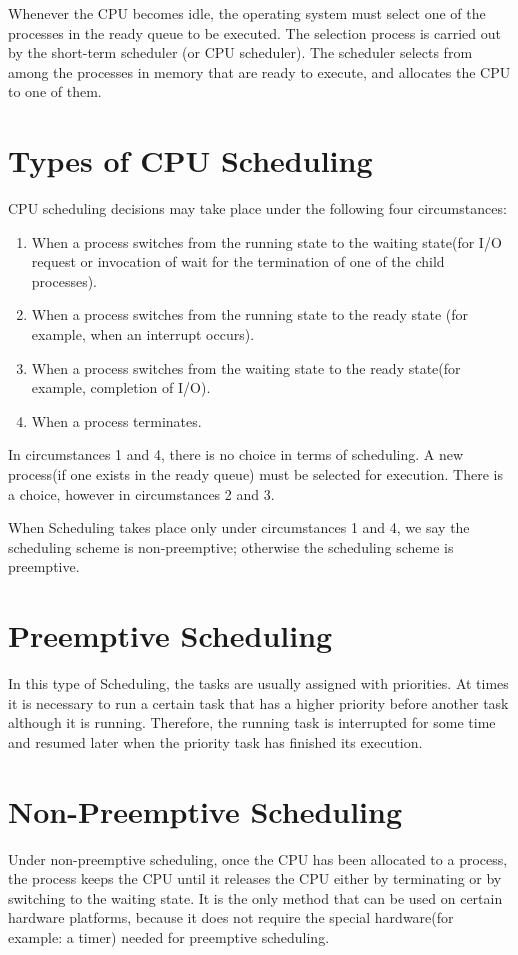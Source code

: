 \documentclass[11pt,a4paper]{report}
\begin{document}
Whenever the CPU becomes idle, the operating system must select one of the processes in the ready queue to be executed. The selection process is carried out by the short-term scheduler (or CPU scheduler). The scheduler selects from among the processes in memory that are ready to execute, and allocates the CPU to one of them.

\section{Types of CPU Scheduling}

CPU scheduling decisions may take place under the following four circumstances:

\begin{enumerate}
	\item When a process switches from the running state to the waiting state(for I/O request or invocation of wait for the termination of one of the child processes).
    \item When a process switches from the running state to the ready state (for example, when an interrupt occurs).
    \item When a process switches from the waiting state to the ready state(for example, completion of I/O).
    \item When a process terminates.
\end{enumerate}
    

In circumstances 1 and 4, there is no choice in terms of scheduling. A new process(if one exists in the ready queue) must be selected for execution. There is a choice, however in circumstances 2 and 3.

When Scheduling takes place only under circumstances 1 and 4, we say the scheduling scheme is non-preemptive; otherwise the scheduling scheme is preemptive.

\section{Preemptive Scheduling}
\hspace*{\parindent}In this type of Scheduling, the tasks are usually assigned with priorities. At times it is necessary to run a certain task that has a higher priority before another task although it is running. Therefore, the running task is interrupted for some time and resumed later when the priority task has finished its execution.

\section{Non-Preemptive Scheduling}
\hspace*{\parindent}Under non-preemptive scheduling, once the CPU has been allocated to a process, the process keeps the CPU until it releases the CPU either by terminating or by switching to the waiting state.
It is the only method that can be used on certain hardware platforms, because it does not require the special hardware(for example: a timer) needed for preemptive scheduling.
\end{document}
